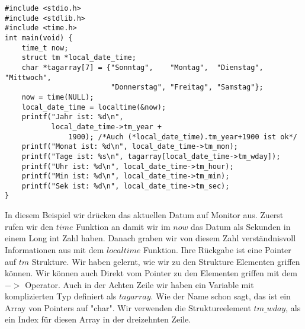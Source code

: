 \begin{lstlisting}
#include <stdio.h>
#include <stdlib.h>
#include <time.h>
int main(void) {
    time_t now;
    struct tm *local_date_time;
    char *tagarray[7] = {"Sonntag",    "Montag",  "Dienstag", "Mittwoch",
                         "Donnerstag", "Freitag", "Samstag"};
    now = time(NULL);
    local_date_time = localtime(&now);
    printf("Jahr ist: %d\n",
           local_date_time->tm_year +
               1900); /*Auch (*local_date_time).tm_year+1900 ist ok*/
    printf("Monat ist: %d\n", local_date_time->tm_mon);
    printf("Tage ist: %s\n", tagarray[local_date_time->tm_wday]);
    printf("Uhr ist: %d\n", local_date_time->tm_hour);
    printf("Min ist: %d\n", local_date_time->tm_min);
    printf("Sek ist: %d\n", local_date_time->tm_sec);
}
\end{lstlisting}
In diesem Beispiel wir drücken das aktuellen Datum auf Monitor aus. Zuerst rufen wir den $time$ Funktion
an damit wir  im $now$ das Datum als Sekunden in einem Long int Zahl haben. Danach graben wir von diesem Zahl 
verständnisvoll Informationen aus mit dem $localtime$ Funktion. Ihre Rückgabe ist eine Pointer auf $tm$ Strukture. 
Wir haben gelernt, wie wir zu den Strukture Elementen griffen können. Wir können auch Direkt vom Pointer
zu den Elementen griffen mit dem $->$ Operator. Auch in der Achten Zeile wir haben ein Variable mit komplizierten
Typ definiert als $tagarray$. Wie der Name schon sagt, das ist ein Array von Pointers auf "char". Wir verwenden
die Struktureelement $tm\_wday$, als ein Index für diesen Array in der dreizehnten Zeile.
